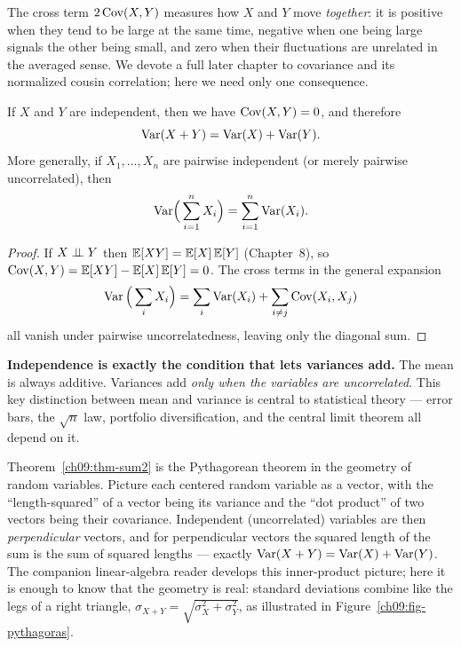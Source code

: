 The cross term $2\operatorname{Cov}(X,Y)$ measures how $X$
and $Y$ move \emph{together}: it is positive when they tend to be large at
the same time, negative when one being large signals the other being small,
and zero when their fluctuations are unrelated in the averaged sense. We
devote a full later chapter to covariance and its normalized cousin
correlation; here we need only one consequence.

\begin{corollary}
\label{ch09:cor-indepadd}
If $X$ and $Y$ are independent, then we have $\operatorname{Cov}(X,Y) = 0$, and therefore
\[
  \operatorname{Var}(X+Y) = \operatorname{Var}(X) + \operatorname{Var}(Y).
\]
More generally, if $X_1, \dots, X_n$ are pairwise independent (or merely
pairwise uncorrelated), then
\[
  \operatorname{Var}\!\Big(\sum_{i=1}^n X_i\Big) = \sum_{i=1}^n \operatorname{Var}(X_i).
\]
\end{corollary}

\begin{proof}
If $X \perp\!\!\!\perp Y$ then $\operatorname{\mathbb{E}}[XY] = \operatorname{\mathbb{E}}[X]\operatorname{\mathbb{E}}[Y]$ (Chapter~8), so
$\operatorname{Cov}(X,Y) = \operatorname{\mathbb{E}}[XY] - \operatorname{\mathbb{E}}[X]\operatorname{\mathbb{E}}[Y] = 0$. The cross terms in
the general expansion
\[
  \operatorname{Var}\Big(\sum_i X_i\Big) = \sum_i \operatorname{Var}(X_i) + \sum_{i\ne j}\operatorname{Cov}(X_i,X_j)
\]
all vanish under pairwise uncorrelatedness,
leaving only the diagonal sum. \qedhere
\end{proof}

\begin{focusbox}
\textbf{Independence is exactly the condition that lets variances add.} The
mean is always additive. Variances add \emph{only when the variables are
uncorrelated}. This key distinction between mean and variance is central to
statistical theory --- error bars, the $\sqrt{n}$ law, portfolio diversification,
and the central limit theorem all depend on it.
\end{focusbox}

\begin{connectionbox}
Theorem~\ref{ch09:thm-sum2} is the Pythagorean theorem in the geometry of random variables. Picture
each centered random variable as a vector, with the ``length-squared'' of a
vector being its variance and the ``dot product'' of two vectors being their
covariance. Independent (uncorrelated) variables are then \emph{perpendicular}
vectors, and for perpendicular vectors the squared length of the sum is the
sum of squared lengths --- exactly $\operatorname{Var}(X+Y) = \operatorname{Var}(X) + \operatorname{Var}(Y)$. The
companion linear-algebra reader develops this inner-product picture; here it
is enough to know that the geometry is real: standard deviations
combine like the legs of a right triangle, $\sigma_{X+Y} =
\sqrt{\sigma_X^2 + \sigma_Y^2}$, as illustrated in Figure~\ref{ch09:fig-pythagoras}.
\end{connectionbox}

